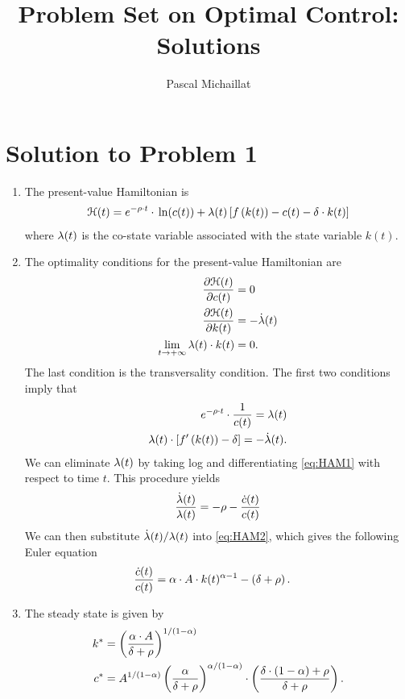 \documentclass[letterpaper,12pt,leqno]{article}
\begin{document}
\title{Problem Set on Optimal Control: Solutions}
\author{Pascal Michaillat}
\date{}

\begin{titlepage}
\maketitle
\end{titlepage}

\section*{Solution to Problem 1}

\begin{enumerate}
\item The present-value Hamiltonian is
\begin{align*}
\Hc(t)=e^{-\rho\cdot  t}\cdot \ln{c(t)} +\l(t) \bs{f\bp{k(t)} -c(t)-\d\cdot  k(t)}
\end{align*}
where $\lambda(t)$ is the co-state variable associated with the state variable $k(t)$.
\item The optimality conditions for the present-value Hamiltonian are
\begin{align*}
\frac{\partial \mathcal{H}(t)}{\partial c(t)} &=0\\
\frac{\partial \mathcal{H}(t)}{\partial k(t)} &=-\dot{\lambda}(t)\\
\lim_{t\to+\infty}\lambda(t)\cdot k(t)&=0.
\end{align*}
The last condition is the transversality condition. The first two conditions imply that 
\begin{align}
e^{-\rho \cdot t}\cdot \frac{1}{c(t)} =\lambda(t)\label{eq:HAM1} \\
\lambda(t)\cdot  \left[ f'\left( k(t) \right) -\delta \right] =-\dot{\lambda}(t).\label{eq:HAM2}
\end{align}
We can eliminate $\lambda(t)$ by taking log and differentiating \eqref{eq:HAM1} with respect to time $t$. This procedure yields
\begin{align*}
\frac{\dot{\lambda}(t)}{\lambda(t)}=-\rho -\frac{\dot{c}(t)}{c(t)}
\end{align*}
We can then substitute $\dot{\lambda}(t)/\lambda(t)$ into \eqref{eq:HAM2}, which gives the following Euler equation
\begin{align*}
\frac{\dot{c}(t)}{c(t)} &=\alpha\cdot A\cdot k(t)^{\alpha -1}-\left( \delta +\rho \right) .
\end{align*}
\item The steady state is given by
\begin{align*}
k^*&=\left( \frac{\alpha\cdot A}{\delta +\rho} \right) ^{1/\left( 1-\alpha \right)}\\
c^*&=A^{1/\left( 1-\alpha \right)}\left( \frac{\alpha}{\delta +\rho} \right)^{\alpha /\left( 1-\alpha \right)}\cdot \left( \frac{\delta \cdot \left( 1-\alpha \right) +\rho}{\delta +\rho} \right).
\end{align*}
\end{enumerate}
\end{document}
